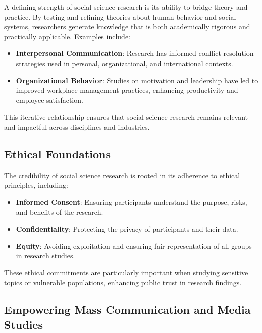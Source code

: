 \documentclass[
]{book}
\providecommand{\tightlist}{%
  \setlength{\itemsep}{0pt}\setlength{\parskip}{0pt}}
\begin{document}
A defining strength of social science research is its ability to bridge theory and practice. By testing and refining theories about human behavior and social systems, researchers generate knowledge that is both academically rigorous and practically applicable. Examples include:

\begin{itemize}
\tightlist
\item
  \textbf{Interpersonal Communication}: Research has informed conflict resolution strategies used in personal, organizational, and international contexts.
\item
  \textbf{Organizational Behavior}: Studies on motivation and leadership have led to improved workplace management practices, enhancing productivity and employee satisfaction.
\end{itemize}

This iterative relationship ensures that social science research remains relevant and impactful across disciplines and industries.

\subsection*{Ethical Foundations}\label{ethical-foundations}

The credibility of social science research is rooted in its adherence to ethical principles, including:

\begin{itemize}
\tightlist
\item
  \textbf{Informed Consent}: Ensuring participants understand the purpose, risks, and benefits of the research.
\item
  \textbf{Confidentiality}: Protecting the privacy of participants and their data.
\item
  \textbf{Equity}: Avoiding exploitation and ensuring fair representation of all groups in research studies.
\end{itemize}

These ethical commitments are particularly important when studying sensitive topics or vulnerable populations, enhancing public trust in research findings.

\subsection*{Empowering Mass Communication and Media Studies}\label{empowering-mass-communication-and-media-studies}
\end{document}
